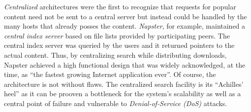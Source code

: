 \documentclass[a4paper,10pt]{article}
\begin{document}
\emph{Centralized} architectures were the first to recognize that requests for popular content need not be sent to a central server but instead could be handled by the many hosts that already posses the content. \emph{Napster}, for example, maintained a \emph{central index server} based on file lists provided by participating peers. The central index server was queried by the users and it returned pointers to the actual content. Thus, by centralizing search while distributing downloads, Napster achieved a high functional design that was widely acknowledged, at the time, as ``the fastest growing Internet application ever''. Of course, the architecture is not without flaws. The centralized search facility is its ``Achilles' heel'' as it can be prooven a bottleneck for the system's scalability as well as a central point of failure and vulnerable to \emph{Denial-of-Service (DoS)} attacks.
\end{document}
